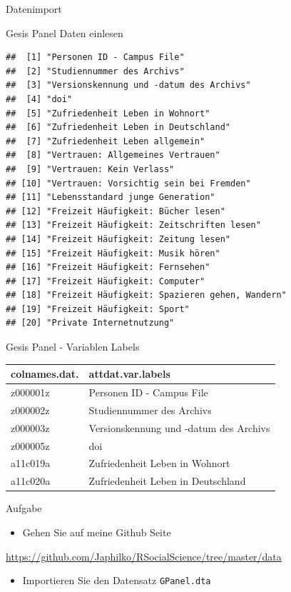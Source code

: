 \documentclass[ignorenonframetext,]{beamer}
\providecommand{\tightlist}{%
\setlength{\itemsep}{0pt}\setlength{\parskip}{0pt}}
\begin{document}
\begin{frame}[fragile]{Datenimport}
\begin{block}{Gesis Panel Daten einlesen}
\begin{verbatim}
##  [1] "Personen ID - Campus File"                    
##  [2] "Studiennummer des Archivs"                    
##  [3] "Versionskennung und -datum des Archivs"       
##  [4] "doi"                                          
##  [5] "Zufriedenheit Leben in Wohnort"               
##  [6] "Zufriedenheit Leben in Deutschland"           
##  [7] "Zufriedenheit Leben allgemein"                
##  [8] "Vertrauen: Allgemeines Vertrauen"             
##  [9] "Vertrauen: Kein Verlass"                      
## [10] "Vertrauen: Vorsichtig sein bei Fremden"       
## [11] "Lebensstandard junge Generation"              
## [12] "Freizeit Häufigkeit: Bücher lesen"            
## [13] "Freizeit Häufigkeit: Zeitschriften lesen"     
## [14] "Freizeit Häufigkeit: Zeitung lesen"           
## [15] "Freizeit Häufigkeit: Musik hören"             
## [16] "Freizeit Häufigkeit: Fernsehen"               
## [17] "Freizeit Häufigkeit: Computer"                
## [18] "Freizeit Häufigkeit: Spazieren gehen, Wandern"
## [19] "Freizeit Häufigkeit: Sport"                   
## [20] "Private Internetnutzung"
\end{verbatim}

\end{block}

\begin{block}{Gesis Panel - Variablen Labels}

\begin{longtable}[]{@{}ll@{}}
\toprule
colnames.dat. & attdat.var.labels\tabularnewline
\midrule
\endhead
z000001z & Personen ID - Campus File\tabularnewline
z000002z & Studiennummer des Archivs\tabularnewline
z000003z & Versionskennung und -datum des Archivs\tabularnewline
z000005z & doi\tabularnewline
a11c019a & Zufriedenheit Leben in Wohnort\tabularnewline
a11c020a & Zufriedenheit Leben in Deutschland\tabularnewline
\bottomrule
\end{longtable}

\end{block}

\begin{block}{Aufgabe}

\begin{itemize}
\tightlist
\item
  Gehen Sie auf meine Github Seite
\end{itemize}

\url{https://github.com/Japhilko/RSocialScience/tree/master/data}

\begin{itemize}
\tightlist
\item
  Importieren Sie den Datensatz \texttt{GPanel.dta}
\end{itemize}

\end{block}

\end{frame}
\end{document}
